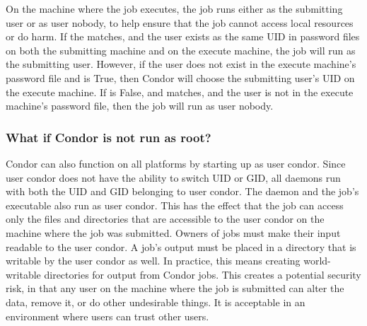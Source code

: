 On the machine where the job executes, the 
job runs either as the submitting user or as user nobody,
to help ensure that the job cannot access local resources or do harm.  
If the  matches,
and the user exists as the same UID in password files
on both the submitting machine and on the execute machine,
the job will run as the submitting user.
However, if the user does not exist in the execute machine's
password file and  is True,
then Condor will choose the submitting user's UID on the
execute machine.
If  is False,
and  matches,
and the user is not in the execute machine's password file,
then the job will run as user nobody.

\subsubsection{\label{sec:norootaccess}What if Condor is not run as root?}

Condor can also function on all platforms by starting up as
user condor.  Since user condor does not have the ability to switch
UID or GID, all daemons run with both the UID and GID belonging
to user condor.
The  daemon and the job's executable also
run as user condor.
This has the effect that
the job can access only the files and directories that are
accessible to the user condor on the machine where the job
was submitted.
Owners of
jobs must make their input readable to the user condor.
A job's output must be placed in a directory that is writable by
the user condor as well.
In practice, this means creating
world-writable directories for output from Condor jobs.
This creates a potential security risk,
in that any user on the machine where the job is submitted
can alter the data, remove it, or do other undesirable things.
It is acceptable in an environment where users can trust other users.

